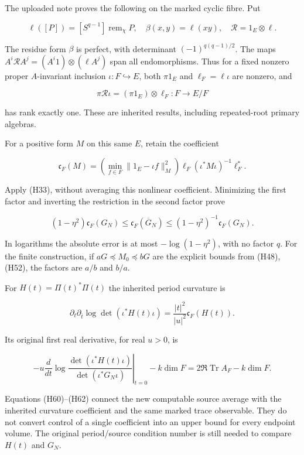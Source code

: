 \documentclass[
]{article}
\begin{document}
The uploaded note proves the following on the marked cyclic fibre. Put

\[
 \ell([P])=[S^{q-1}]\operatorname{rem}_\chi P,\quad
 \beta(x,y)=\ell(xy),\quad\mathcal R=1_E\otimes\ell.
 \tag{H57}
\]

The residue form \(\beta\) is perfect, with determinant
\((-1)^{q(q-1)/2}\). The maps
\(A^i\mathcal RA^j=(A^i1)\otimes(\ell A^j)\) span all endomorphisms.
Thus for a fixed nonzero proper \(A\)-invariant inclusion
\(\iota:F\hookrightarrow E\), both \(\pi1_E\) and \(\ell_F=\ell\iota\)
are nonzero, and

\[
 \pi\mathcal R\iota=(\pi1_E)\otimes\ell_F:F\to E/F
 \tag{H58}
\]

has rank exactly one. These are inherited results, including
repeated-root primary algebras.

For a positive form \(M\) on this same \(E\), retain the coefficient

\[
 \mathfrak c_F(M)=
 \left(\min_{f\in F}\|1_E-\iota f\|_M^2\right)
 \ell_F(\iota^*M\iota)^{-1}\ell_F^*.
 \tag{H59}
\]

Apply (H33), without averaging this nonlinear coefficient. Minimizing
the first factor and inverting the restriction in the second factor
prove

\[
 \boxed{
 (1-\eta^2)\mathfrak c_F(G_N)
 \leq\mathfrak c_F(\overline G_N)
 \leq(1-\eta^2)^{-1}\mathfrak c_F(G_N).}
 \tag{H60}
\]

In logarithms the absolute error is at most \(-\log(1-\eta^2)\), with no
factor \(q\). For the finite construction, if
\(aG\preceq M_0\preceq bG\) are the explicit bounds from (H48), (H52),
the factors are \(a/b\) and \(b/a\).

For \(H(t)=\Pi(t)^*\Pi(t)\) the inherited period curvature is

\[
 \partial_t\partial_{\bar t}\log\det(\iota^*H(t)\iota)
 =\frac{|t|^2}{|u|^2}\mathfrak c_F(H(t)).
 \tag{H61}
\]

Its original first real derivative, for real \(u>0\), is

\[
 -u\left.\frac d{dt}\log
 \frac{\det(\iota^*H(t)\iota)}{\det(\iota^*G_N\iota)}
 \right|_{t=0}-k\dim F
 =2\Re\operatorname{Tr}A_F-k\dim F.
 \tag{H62}
\]

Equations (H60)--(H62) connect the new computable source average with
the inherited curvature coefficient and the same marked trace
observable. They do not convert control of a single coefficient into an
upper bound for every endpoint volume. The original period/source
condition number is still needed to compare \(H(t)\) and \(G_N\).
\end{document}
